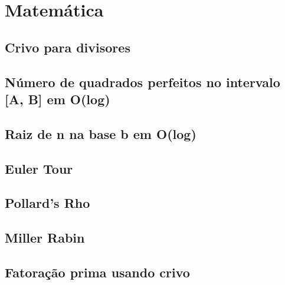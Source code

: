 \section{Matemática}

\subsection{Crivo para divisores}


\subsection{Número de quadrados perfeitos no intervalo [A, B] em O(log)}


\subsection{Raiz de n na base b em O(log)}


\subsection{Euler Tour}


\subsection{Pollard's Rho}


\subsection{Miller Rabin}


\subsection{Fatoração prima usando crivo}
